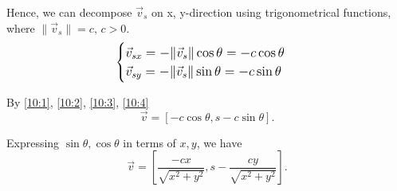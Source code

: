 \documentclass[12pt,a4paper]{article}
\begin{document}
\begin{solution}
Hence, we can decompose $\Vec{v}_s$ on x, y-direction using trigonometrical functions, where 
$\|\Vec{v}_s \| = c, \, c>0$.
\begin{equation}\label{10:4}
    \large
    \begin{cases}
        \Vec{v}_{sx} = -\|\Vec{v}_s \|\cos{\theta}=-c\cos{\theta}\\
        \Vec{v}_{sy} = -\|\Vec{v}_s \|\sin{\theta}=-c\sin{\theta}
    \end{cases}
\end{equation}

By \eqref{10:1}, \eqref{10:2}, \eqref{10:3}, \eqref{10:4}
\[
 \Vec{v} = [-c\cos{\theta}, s - c\sin{\theta} ].
\]

Expressing $\sin{\theta}, \cos{\theta}$ in terms of $x, y$, we have
\[
\Vec{v} = \left[\frac{-c x}{\sqrt{x^2+y^2}}, s-\frac{c y}{\sqrt{x^2+y^2}} \right].
\]
\end{solution}
\end{document}
